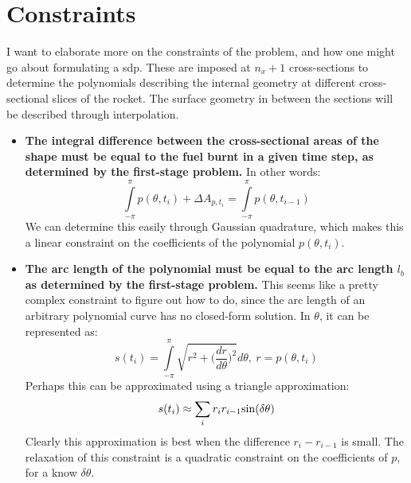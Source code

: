 \documentclass[11pt]{article}
\begin{document}
\section{Constraints}

I want to elaborate more on the constraints of the problem, and how one might go about formulating a \gls{sdp}. These are imposed at $n_x+1$ cross-sections to determine the polynomials describing the internal geometry at different cross-sectional slices of the rocket. The surface geometry in between the sections will be described through interpolation. 

\begin{itemize}
\item \textbf{The integral difference between the cross-sectional areas of the shape must be equal to the fuel burnt in a given time step, as determined by the first-stage problem.} In other words: 
\begin{equation}
\int\limits_{-\pi}^{\pi} p(\theta, t_i) + \Delta A_{p, t_i} = \int\limits_{-\pi}^{\pi} p(\theta, t_{i-1})
\end{equation} We can determine this easily through Gaussian quadrature, which makes this a linear constraint on the coefficients of the polynomial $p(\theta, t_i)$. 
\item \textbf{The arc length of the polynomial must be equal to the arc length $l_b$ as determined by the first-stage problem.} This seems like a pretty complex constraint to figure out how to do, since the arc length of an arbitrary polynomial curve has no closed-form solution. In $\theta$, it can be represented as:
\begin{equation}
s(t_i) = \int\limits_{-\pi}^{\pi} \sqrt{r^2 + \Big(\frac{dr}{d\theta}\Big)^2} d\theta, ~r = p(\theta, t_i)
\end{equation}
Perhaps this can be approximated using a triangle approximation:
\begin{equation}
s(t_i) \approx \sum\limits_i r_{i}r_{i-1}\rm{sin}(\delta\theta)
\end{equation}
Clearly this approximation is best when the difference $r_{i} - r_{i-1}$ is small. The relaxation of this constraint is a quadratic constraint on the coefficients of $p$, for a know $\delta\theta$. 


\end{itemize}
\end{document}
